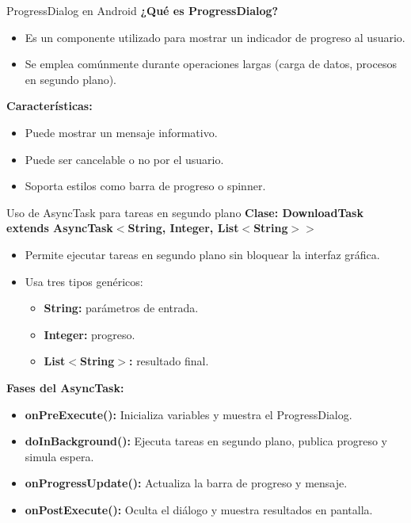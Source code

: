 \begin{frame}[fragile]{ProgressDialog en Android}
\textbf{¿Qué es ProgressDialog?}

\begin{itemize}
    \item Es un componente utilizado para mostrar un indicador de progreso al usuario.
    \item Se emplea comúnmente durante operaciones largas (carga de datos, procesos en segundo plano).
\end{itemize}


\textbf{Características:}
\begin{itemize}
    \item Puede mostrar un mensaje informativo.
    \item Puede ser cancelable o no por el usuario.
    \item Soporta estilos como barra de progreso o spinner.
\end{itemize}

\end{frame}


\begin{frame}[fragile]{Uso de AsyncTask para tareas en segundo plano}
\textbf{Clase: DownloadTask extends AsyncTask$<$String, Integer, List$<$String$>$$>$}

\begin{itemize}
    \item Permite ejecutar tareas en segundo plano sin bloquear la interfaz gráfica.
    \item Usa tres tipos genéricos:
    \begin{itemize}
        \item \textbf{String:} parámetros de entrada.
        \item \textbf{Integer:} progreso.
        \item \textbf{List$<$String$>$:} resultado final.
    \end{itemize}
\end{itemize}

\vspace{0.3cm}

\textbf{Fases del AsyncTask:}
\begin{itemize}
    \item \textbf{onPreExecute():} Inicializa variables y muestra el ProgressDialog.
    \item \textbf{doInBackground():} Ejecuta tareas en segundo plano, publica progreso y simula espera.
    \item \textbf{onProgressUpdate():} Actualiza la barra de progreso y mensaje.
    \item \textbf{onPostExecute():} Oculta el diálogo y muestra resultados en pantalla.
\end{itemize}



\end{frame}


